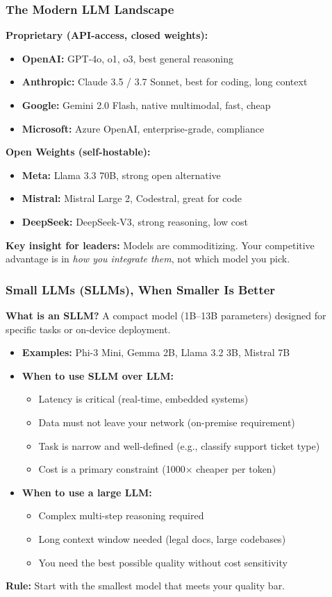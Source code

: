 \begin{frame}[fragile]\frametitle{The Modern LLM Landscape}
\textbf{Proprietary (API-access, closed weights):}
\begin{itemize}
\item \textbf{OpenAI:} GPT-4o, o1, o3, best general reasoning
\item \textbf{Anthropic:} Claude 3.5 / 3.7 Sonnet, best for coding, long context
\item \textbf{Google:} Gemini 2.0 Flash, native multimodal, fast, cheap
\item \textbf{Microsoft:} Azure OpenAI, enterprise-grade, compliance
\end{itemize}

\textbf{Open Weights (self-hostable):}
\begin{itemize}
\item \textbf{Meta:} Llama 3.3 70B, strong open alternative
\item \textbf{Mistral:} Mistral Large 2, Codestral, great for code
\item \textbf{DeepSeek:} DeepSeek-V3, strong reasoning, low cost
\end{itemize}

\textbf{Key insight for leaders:} Models are commoditizing. Your competitive advantage is in \textit{how you integrate them}, not which model you pick.
\end{frame}

\begin{frame}[fragile]\frametitle{Small LLMs (SLLMs), When Smaller Is Better}
\textbf{What is an SLLM?} A compact model (1B--13B parameters) designed for specific tasks or on-device deployment.

\begin{itemize}
\item \textbf{Examples:} Phi-3 Mini, Gemma 2B, Llama 3.2 3B, Mistral 7B
\item \textbf{When to use SLLM over LLM:}
  \begin{itemize}
  \item Latency is critical (real-time, embedded systems)
  \item Data must not leave your network (on-premise requirement)
  \item Task is narrow and well-defined (e.g., classify support ticket type)
  \item Cost is a primary constraint (1000$\times$ cheaper per token)
  \end{itemize}
\item \textbf{When to use a large LLM:}
  \begin{itemize}
  \item Complex multi-step reasoning required
  \item Long context window needed (legal docs, large codebases)
  \item You need the best possible quality without cost sensitivity
  \end{itemize}
\end{itemize}
\textbf{Rule:} Start with the smallest model that meets your quality bar.
\end{frame}

